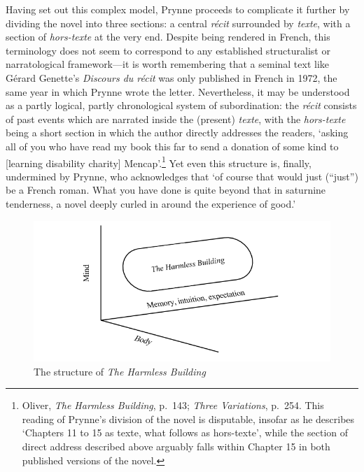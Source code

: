 \documentclass[]{article}
\begin{document}
Having set out this complex model, Prynne proceeds to complicate it
further by dividing the novel into three sections: a central
\emph{récit} surrounded by \emph{texte}, with a section of
\emph{hors-texte} at the very end. Despite being rendered in French,
this terminology does not seem to correspond to any established
structuralist or narratological framework---it is worth remembering that
a seminal text like Gérard Genette's \emph{Discours du récit} was only
published in French in 1972, the same year in which Prynne wrote the
letter. Nevertheless, it may be understood as a partly logical, partly
chronological system of subordination: the \emph{récit} consists of past
events which are narrated inside the (present) \emph{texte}, with the
\emph{hors-texte} being a short section in which the author directly
addresses the readers, `asking all of you who have read my book this far
to send a donation of some kind to {[}learning disability charity{]}
Mencap'.\footnote{Oliver, \emph{The Harmless Building}, p.~143;
  \emph{Three Variations}, p.~254. This reading of Prynne's division of
  the novel is disputable, insofar as he describes `Chapters 11 to 15 as
  texte, what follows as hors-texte', while the section of direct
  address described above arguably falls within Chapter 15 in both
  published versions of the novel.} Yet even this structure is, finally,
undermined by Prynne, who acknowledges that `of course that would just
(``just'') be a French roman. What you have done is quite beyond that in
saturnine tenderness, a novel deeply curled in around the experience of
good.'

\begin{figure}[t]
\centering
\includegraphics{figs/thb.png}
\caption{The structure of \emph{The Harmless Building}\label{fig:thb}}
\end{figure}
\end{document}
